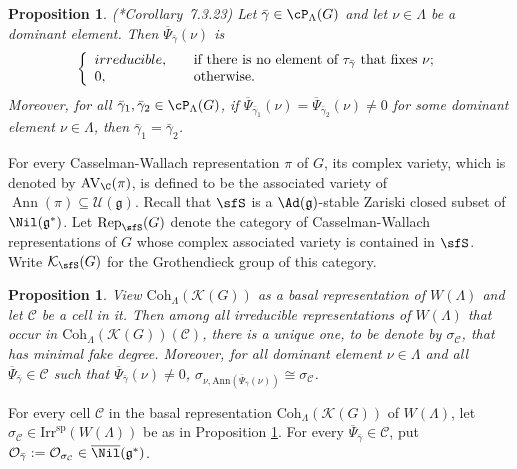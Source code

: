 \documentclass[12pt,a4paper]{amsart}
\newcommand{\AV}{\mathrm{AV}}
\def\subset{\subseteq}
\newcommand{\CC}{{\mathcal {C}}}
\newcommand{\CK}{{\mathcal {K}}}
\newcommand{\CO}{{\mathcal {O}}}
\newcommand{\CU}{{\mathcal {U}}}
\DeclareMathOperator{\Ann}{Ann}
\newcommand{\g}{\mathfrak g}
\numberwithin{equation}{section}
\newtheorem{prop}[thm]{Proposition}
\theoremstyle{remark}
\def\Irr{\mathrm{Irr}}
\def\Coh{\mathrm{Coh}}
\begin{document}
\begin{prop}\label{lemirr} (\cite{V4}*{Corollary~7.3.23})
Let $\bar \gamma\in \cP_\Lambda(G)$ and let $\nu\in \Lambda$ be a dominant element. Then  $\overline \Psi_{\bar \gamma}(\nu)$ is
\[
\left\{
                  \begin{array}{ll}
                   irreducible,\quad &\textrm{if there is no element of   $ \tau_{\bar\gamma}$  that fixes $\nu$};\\
                    0, \quad &\textrm{otherwise}.
                    \end{array}
                    \right.
                    \]
                    Moreover, for all  $\bar \gamma_1, \bar \gamma_2\in \cP_\Lambda(G)$, if  $\overline \Psi_{\bar \gamma_1}(\nu)=\overline \Psi_{\bar \gamma_2}(\nu)\neq 0$ for some   dominant element $\nu\in \Lambda$, then $\bar \gamma_1=\bar \gamma_2$.




\end{prop}


For every Casselman-Wallach representation $\pi$ of $G$, its complex variety, which is denoted by $\AV_\C(\pi)$, is defined to be the associated variety of $\Ann(\pi)\subset \CU(\g)$.
 Recall that $\sfS$ is a $\Ad(\g)$-stable Zariski closed subset of $\Nil(\g^*)$. Let $\mathrm{Rep}_\sfS(G)$ denote the
category of Casselman-Wallach representations of $G$ whose complex associated
variety is contained in $\sfS$. Write
 $\CK_{\sfS}(G)$ for the Grothendieck group of this category.

\begin{prop}\label{hcass22}
View  $\Coh_{\Lambda}(\CK(G))$ as a basal representation of $W(\Lambda)$ and let $\CC$ be a cell in it. Then among all irreducible representations of $W(\Lambda)$ that occur in
$\Coh_{\Lambda}(\CK(G))(\CC)$, there is a unique one, to be denote by $\sigma_\CC$, that has minimal fake degree. Moreover, for all   dominant element $\nu\in \Lambda$ and  all $\overline \Psi_{\bar \gamma}\in  \CC$ such that  $\overline{\Psi}_{\bar \gamma}(\nu)\neq 0$, $\sigma_{\nu, \mathrm{Ann}(\overline{\Psi}_{\bar \gamma}(\nu))}\cong \sigma_\CC$.


\end{prop}

For every cell $\CC$ in the basal representation $\Coh_{\Lambda}(\CK(G))$ of $W(\Lambda)$, let $\sigma_\CC\in \Irr^{\mathrm{sp}}(W(\Lambda))$ be as in Proposition \ref{hcass22}.
For every $\overline{\Psi}_{\bar \gamma}\in \CC$, put $\CO_{\bar \gamma}:=\CO_{\sigma_\CC}\in  \overline{\Nil}(\g^*)$.
\end{document}
